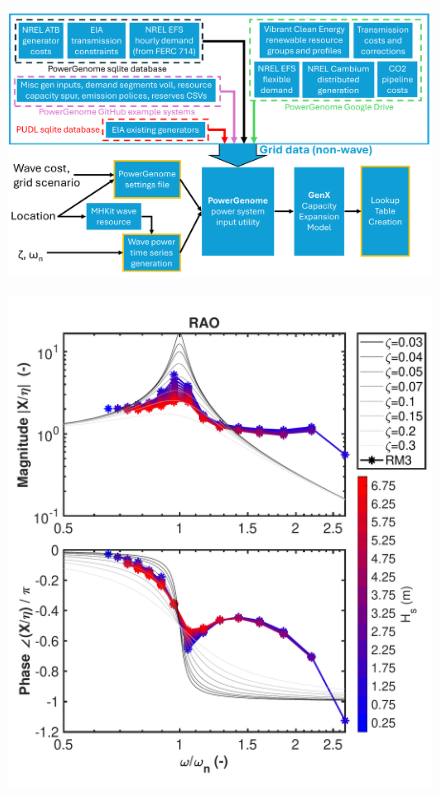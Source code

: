 \documentclass[10pt,twoside]{article}
\begin{document}
\begin{figure}[t]
\noindent
\begin{minipage}[b]{0.64\textwidth}
    \centering
    \includegraphics[width=\linewidth]{figures/PowerGenomeDataFlow_no_beta.pdf}
    \label{fig:CEM-data-flow}
\end{minipage}
\hfill
\begin{minipage}[b]{0.36\textwidth}
    \centering
    \includegraphics[width=\linewidth]{figures/bode_second_order.pdf}
    \label{fig:bode}
\end{minipage}
\end{figure}
\end{document}
